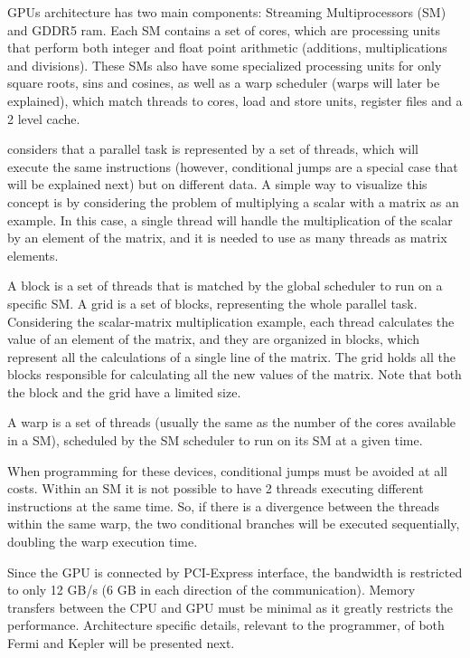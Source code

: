 \nvidia GPUs architecture has two main components: Streaming Multiprocessors (SM) and GDDR5 ram. Each SM contains a set of \cuda cores, which are processing units that perform both integer and float point arithmetic (additions, multiplications and divisions). These SMs also have some specialized processing units for only square roots, sins and cosines, as well as a warp scheduler (warps will later be explained), which match \cuda threads to \cuda cores, load and store units, register files and a 2 level cache.

\nvidia considers that a parallel task is represented by a set of \cuda threads, which will execute the same instructions (however, conditional jumps are a special case that will be explained next) but on different data. A simple way to visualize this concept is by considering the problem of multiplying a scalar with a matrix as an example. In this case, a single thread will handle the multiplication of the scalar by an element of the matrix, and it is needed to use as many \cuda threads as matrix elements.

A block is a set of \cuda threads that is matched by the global scheduler to run on a specific SM. A grid is a set of blocks, representing the whole parallel task. Considering the scalar-matrix multiplication example, each \cuda thread calculates the value of an element of the matrix, and they are organized in blocks, which represent all the calculations of a single line of the matrix. The grid holds all the blocks responsible for calculating all the new values of the matrix. Note that both the block and the grid have a limited size.

A warp is a set of \cuda threads (usually the same as the number of the \cuda cores available in a SM), scheduled by the SM scheduler to run on its SM at a given time.

When programming for these devices, conditional jumps must be avoided at all costs. Within an SM it is not possible to have 2 threads executing different instructions at the same time. So, if there is a divergence between the threads within the same warp, the two conditional branches will be executed sequentially, doubling the warp execution time.

Since the GPU is connected by PCI-Express interface, the bandwidth is restricted to only 12 GB/s (6 GB in each direction of the communication). Memory transfers between the CPU and GPU must be minimal as it greatly restricts the performance.
Architecture specific details, relevant to the programmer, of both Fermi and Kepler will be presented next.

